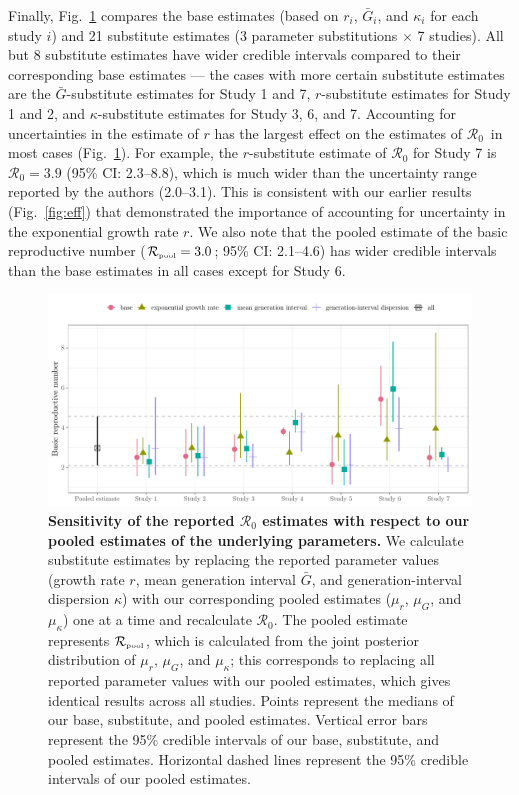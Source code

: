 \documentclass[12pt]{article}
\newcommand{\fref}[1]{Fig.~\ref{fig:#1}}
\newcommand{\Ro}{\ensuremath{{\mathcal R}_{0}}\xspace}
\newcommand{\Rpool}{\ensuremath{{\mathcal R}_{\textrm{\tiny{pool}}}}\xspace}
\begin{document}
Finally, \fref{R0} compares the base estimates (based on $r_i$, $\bar G_i$, and $\kappa_i$ for each study $i$) and 21 substitute estimates (3 parameter substitutions $\times$ 7 studies).
All but 8 substitute estimates have wider credible intervals compared to their corresponding base estimates --- the cases with more certain substitute estimates are the $\bar G$-substitute estimates for Study 1 and 7, $r$-substitute estimates for Study 1 and 2, and  $\kappa$-substitute estimates for Study 3, 6, and 7.
Accounting for uncertainties in the estimate of $r$ has the largest effect on the estimates of \Ro\ in most cases (\fref{R0}).
For example, the $r$-substitute estimate of \Ro for Study 7 is $\Ro = 3.9$ (95\% CI: 2.3--8.8), which is much wider than the uncertainty range reported by the authors (2.0--3.1).
This is consistent with our earlier results (\fref{eff}) that demonstrated the importance of accounting for uncertainty in the exponential growth rate $r$.
We also note that the pooled estimate of the basic reproductive number ($\Rpool = 3.0$; 95\% CI: 2.1--4.6) has wider credible intervals than the base estimates in all cases except for Study 6.

\begin{figure}[!th]
\includegraphics[width=\textwidth]{compare_R0.pdf}
\caption{
\textbf{Sensitivity of the reported \Ro estimates with respect to our pooled estimates of the underlying parameters.}
We calculate substitute estimates by replacing the reported parameter values (growth rate $r$, mean generation interval $\bar G$, and generation-interval dispersion $\kappa$) with our corresponding pooled estimates ($\mu_r$, $\mu_G$, and $\mu_\kappa$) one at a time and recalculate \Ro.
The pooled estimate represents \Rpool, which is calculated from the joint posterior distribution of $\mu_r$, $\mu_G$, and $\mu_\kappa$;
this corresponds to replacing all reported parameter values with our pooled estimates, which gives identical results across all studies.
Points represent the medians of our base, substitute, and pooled estimates.
Vertical error bars represent the 95\% credible intervals of our base, substitute, and pooled estimates.
Horizontal dashed lines represent the 95\% credible intervals of our pooled estimates.
}
\label{fig:R0}
\end{figure}
\end{document}
